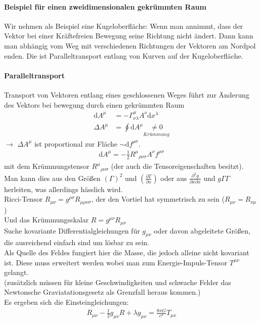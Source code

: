\documentclass[a4paper]{article}
\begin{document}
\paragraph{Beispiel für einen zweidimensionalen gekrümmten Raum}
Wir nehmen als Beispiel eine Kugeloberfläche:
Wenn man annimmt, dass der Vektor bei einer Kräftefreien Bewegung seine Richtung
nicht ändert. Dann kann man abhängig vom Weg mit verschiedenen Richtungen der
Vektoren am Nordpol enden. Die ist Paralleltransport entlang von Kurven auf der
Kugeloberfläche.
\paragraph{Paralleltransport}
Transport von Vektoren entlang eines geschlossenen Weges führt zur Änderung des
Vektors bei bewegung durch einen gekrümmten Raum
\begin{align}
\mathrm{d}A^\mu &= - \Gamma^\mu_{\nu\lambda} A^\nu \mathrm{d}x^\lambda\\
\Delta A^\mu &= \oint \mathrm{d} A^\mu\underset{Krümmung}{\neq0}
\end{align}
$\rightarrow$ $\Delta A^\mu$ ist proportional zur Fläche $\sim
\mathrm{d}f^{\rho\sigma}$. 
\begin{align}
\mathrm{d}A^\mu=-\frac{1}{2}R^\mu{}_{\rho\nu\sigma}A^\nu f^{\rho\sigma} 
\end{align}
mit dem Krümmungstensor $R^\mu{}_{\rho\nu\sigma}$ (der auch die
Tensoreigenschaften besitzt). Man kann dies aus den Größen
$(\Gamma)^2$ und $\left( \frac{\partial \Gamma}{\partial x} \right)$ oder aus
$\frac{\partial^2 g}{\partial x\partial x}$ und $g\Gamma\Gamma$ herleiten, was
allerdings hässlich wird.\\
Ricci-Tensor $R_{\mu\nu}=g^{\rho\sigma}R_{\mu\rho\nu\sigma}$, der den Vortiel
hat symmetrisch zu sein ($R_{\mu\nu}=R_{\nu\mu}$)\\
Und das Krümmungsskalar $R=g^{\mu\nu}R_{\mu\nu}$\\
Suche kovariante Differentialgleichungen für $g_{\mu\nu}$
oder davon abgeleitete Größen, die ausreichend einfach sind um lösbar zu sein.\\
Als Quelle des Feldes fungiert hier die Masse, die jedoch alleine nicht
kovariant ist. Diese muss erweitert werden wobei man zum Energie-Impuls-Tensor
$T^{\mu\nu}$ gelangt. \\
(zusätzlich müssen für kleine Geschwindigkeiten und schwache Felder das
Newtonsche Graviatationsgesetz als Grenzfall heraus kommen.)\\
Es ergeben sich die Einsteingleichungen:
\begin{align}
R_{\mu\nu}-\frac{1}{2}g_{\mu\nu}R+\lambda g_{\mu\nu}=\frac{8\pi
G}{c^4}T_{\mu\nu}
\end{align}
\end{document}

